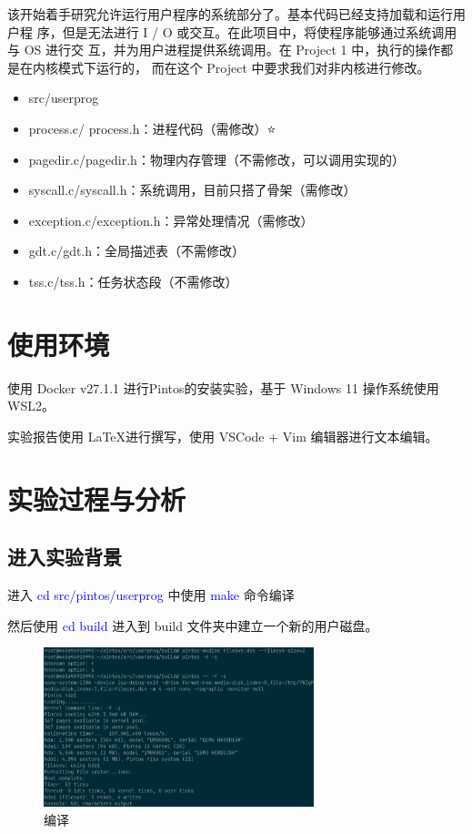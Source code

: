 \documentclass[14pt,a4paper,UTF8,twoside]{article}
\renewcommand{\texttt}[1]{\textcolor{blue}{\ttfamily #1}}
\begin{document}
该开始着手研究允许运行用户程序的系统部分了。基本代码已经支持加载和运行用户程
序，但是无法进行 I / O 或交互。在此项目中，将使程序能够通过系统调用与 OS 进行交
互，并为用户进程提供系统调用。在 Project 1 中，执行的操作都是在内核模式下运行的，
而在这个 Project 中要求我们对非内核进行修改。

\begin{itemize}
    \item src/userprog
    \item process.c/ process.h：进程代码（需修改）⭐
    \item pagedir.c/pagedir.h：物理内存管理（不需修改，可以调用实现的）
    \item syscall.c/syscall.h：系统调用，目前只搭了骨架（需修改）🌟
    \item exception.c/exception.h：异常处理情况（需修改） 
    \item gdt.c/gdt.h：全局描述表（不需修改）
    \item tss.c/tss.h：任务状态段（不需修改）
\end{itemize}

\section{使用环境}

使用 Docker v27.1.1 进行Pintos的安装实验，基于 Windows 11 操作系统使用 WSL2。

实验报告使用 \LaTeX 进行撰写，使用 VSCode + Vim 编辑器进行文本编辑。

\section{实验过程与分析}

\subsection{进入实验背景}

进入 \texttt{cd src/pintos/userprog} 中使用 \texttt{make} 命令编译

然后使用 \texttt{cd build} 进入到 build 文件夹中建立一个新的用户磁盘。

\begin{figure}[H]
    \centering
    \includegraphics[width=0.7\textwidth]{img5/createfilesys.png}
    \caption{编译}
    \label{fig:make}
\end{figure}
\end{document}
